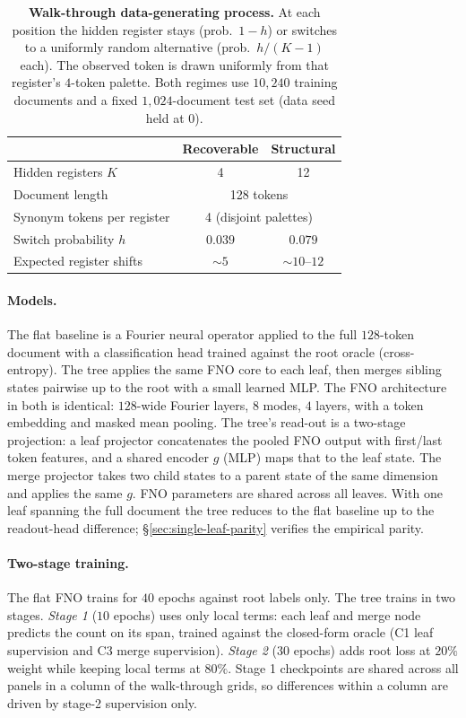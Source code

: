 \begin{table}[t]
    \centering
    \small
    \begin{tabular}{lcc}
        \toprule
        & \textbf{Recoverable} & \textbf{Structural} \\
        \midrule
        Hidden registers $K$ & 4 & 12 \\
        Document length & \multicolumn{2}{c}{128 tokens} \\
        Synonym tokens per register & \multicolumn{2}{c}{4 (disjoint palettes)} \\
        \midrule
        Switch probability $h$ & $0.039$ & $0.079$ \\
        Expected register shifts & ${\sim}5$ & ${\sim}10$--$12$ \\
        \bottomrule
    \end{tabular}
    \caption{\textbf{Walk-through data-generating process.}
    At each position the hidden register stays (prob.\ $1{-}h$) or switches to a uniformly random alternative (prob.\ $h/(K{-}1)$ each). The observed token is drawn uniformly from that register's $4$-token palette. Both regimes use $10{,}240$ training documents and a fixed $1{,}024$-document test set (data seed held at $0$).}
    \label{tab:dgp}
\end{table}

\paragraph{Models.}
The flat baseline is a Fourier neural operator applied to the full
$128$-token document with a classification head trained against the
root oracle (cross-entropy). The tree applies the same FNO core to
each leaf, then merges sibling states pairwise up to the root with a
small learned MLP. The FNO architecture in both is identical:
$128$-wide Fourier layers, $8$ modes, $4$ layers, with a token
embedding and masked mean pooling. The tree's read-out is a two-stage
projection: a leaf projector concatenates the pooled FNO output with
first/last token features, and a shared encoder $g$ (MLP) maps that
to the leaf state. The merge projector takes two child states to a
parent state of the same dimension and applies the same $g$. FNO
parameters are shared across all leaves. With one leaf spanning the
full document the tree reduces to the flat baseline up to the
readout-head difference; \S\ref{sec:single-leaf-parity} verifies the
empirical parity.

\paragraph{Two-stage training.}
The flat FNO trains for $40$ epochs against root labels only. The
tree trains in two stages. \emph{Stage 1} ($10$ epochs) uses only
local terms: each leaf and merge node predicts the count on its span,
trained against the closed-form oracle (C1 leaf supervision and C3
merge supervision). \emph{Stage 2} ($30$ epochs) adds root loss at
$20\%$ weight while keeping local terms at $80\%$. Stage 1
checkpoints are shared across all panels in a column of the
walk-through grids, so differences within a column are driven by
stage-2 supervision only.

